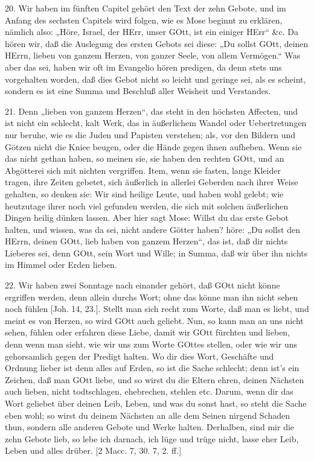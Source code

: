 20. Wir haben im fünften Capitel gehört den Text der zehn Gebote, und im Anfang des sechsten Capitels wird folgen, wie es Mose beginnt zu erklären, nämlich also: „Höre, Israel, der HErr, unser GOtt, ist ein einiger HErr“ \&c. Da hören wir, daß die Auslegung des ersten Gebots sei diese: „Du sollst GOtt, deinen HErrn, lieben von ganzem Herzen, von ganzer Seele, von allem Vermögen.“ Was aber das sei, haben wir oft im Evangelio hören predigen, da denn stets uns vorgehalten worden, daß dies Gebot nicht so leicht und geringe sei, als es scheint, sondern es ist eine Summa und Beschluß aller Weisheit und Verstandes.

21. Denn „lieben von ganzem Herzen“, das steht in den höchsten Affecten, und ist nicht ein schlecht, kalt Werk, das in äußerlichem Wandel oder Uebertretungen nur beruhe, wie es die Juden und Papisten verstehen; als, vor den Bildern und Götzen nicht die Kniee beugen, oder die Hände gegen ihnen aufheben. Wenn sie das nicht gethan haben, so meinen sie, sie haben den rechten GOtt, und an Abgötterei sich mit nichten vergriffen. Item, wenn sie fasten, lange Kleider tragen, ihre Zeiten gebetet, sich äußerlich in allerlei Geberden nach ihrer Weise gehalten, so denken sie: Wir sind heilige Leute, und haben wohl gelebt; wie heutzutage ihrer noch viel gefunden werden, die sich mit solchen
äußerlichen Dingen heilig dünken lassen. Aber hier sagt Mose: Willst du das erste Gebot halten, und wissen, was da sei, nicht andere Götter haben? höre: „Du sollst den HErrn, deinen GOtt, lieb haben von ganzem Herzen“, das ist, daß dir nichts Lieberes sei, denn GOtt, sein Wort und Wille; in Summa, daß wir über ihn nichts im Himmel oder Erden lieben.

22. Wir haben zwei Sonntage nach einander gehört, daß GOtt nicht könne ergriffen werden, denn allein durchs Wort; ohne das könne man ihn nicht sehen noch fühlen [Joh. 14, 23.]. Stellt man sich recht zum Worte, daß man es liebt, und meint es von Herzen, so wird GOtt auch geliebt. Nun, so kann man an uns nicht sehen, fühlen oder erfahren diese Liebe, damit wir GOtt fürchten und lieben, denn wenn man sieht, wie wir uns zum Worte GOttes stellen, oder wie wir uns gehorsamlich gegen der Predigt halten. Wo dir dies Wort, Geschäfte und Ordnung lieber ist denn alles auf Erden, so ist die Sache schlecht; denn ist’s ein Zeichen, daß man GOtt liebe, und so wirst du die Eltern ehren, deinen Nächsten auch lieben, nicht todtschlagen, ehebrechen, stehlen etc. Darum, wenn dir das Wort geliebet über deinen Leib, Leben, und was du sonst hast, so steht die Sache eben wohl; so wirst du deinem Nächsten an alle dem Seinen nirgend Schaden thun, sondern alle anderen Gebote und Werke halten. Derhalben, sind mir die zehn Gebote lieb, so lebe ich darnach, ich lüge und trüge nicht, lasse eher Leib, Leben und alles drüber. [2 Macc. 7, 30. 7, 2. ff.]

